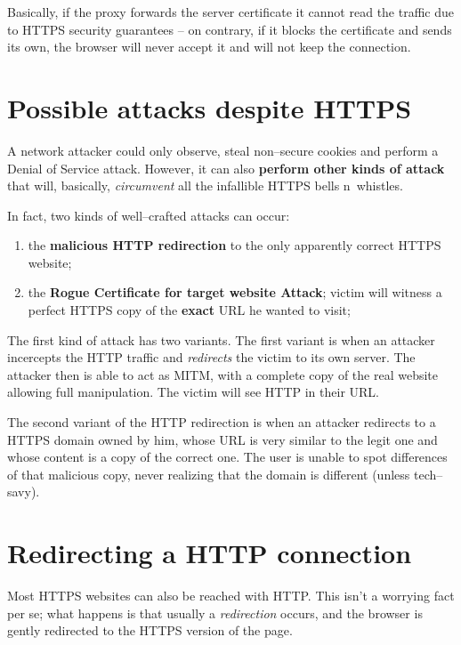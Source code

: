 \documentclass[10pt]{extbook}
\begin{document}
Basically, if the proxy forwards the server certificate it cannot read the
traffic due to HTTPS security guarantees -- on contrary, if it blocks the
certificate and sends its own, the browser will never accept it and will not
keep the connection.

\section{Possible attacks despite HTTPS}

A network attacker could only observe, steal non--secure cookies and perform a
Denial of Service attack. However, it can also \textbf{perform other kinds of
attack} that will, basically, \emph{circumvent} all the infallible HTTPS
bells n\textquotesingle\  whistles.

In fact, two kinds of well--crafted attacks can occur:
\begin{enumerate}
    \item the \textbf{malicious HTTP redirection} to the only apparently correct
        HTTPS website;
    \item the \textbf{Rogue Certificate for target website Attack}; victim will
        witness a perfect HTTPS copy of the \textbf{exact} URL he wanted to
        visit;
\end{enumerate}

The first kind of attack has two variants. The first variant is when an
attacker incercepts the HTTP traffic and \emph{redirects} the victim to its own
server. The attacker then is able to act as MITM, with a complete copy of the
real website allowing full manipulation. The victim will see HTTP in their URL.

The second variant of the HTTP redirection is when an attacker redirects to a
HTTPS domain owned by him, whose URL is very similar to the legit one and whose
content is a copy of the correct one. The user is unable to spot differences of
that malicious copy, never realizing that the domain is different (unless
tech--savy).

\section{Redirecting a HTTP connection}

Most HTTPS websites can also be reached with HTTP. This isn't a worrying fact
per se; what happens is that usually a \emph{redirection} occurs, and the
browser is gently redirected to the HTTPS version of the page.
\end{document}
